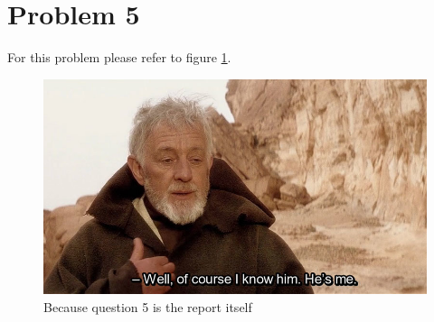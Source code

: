 \documentclass[a4paper, 12pt]{article}
\begin{document}
\section{Problem 5}
For this problem please refer to figure \ref{fig:obi}.

\begin{figure}[h!]
	\centering
	\includegraphics[width=\textwidth]{./Images/obi}
	\caption{Because question 5 is the report itself}
	\label{fig:obi}
\end{figure}

%
\end{document}
